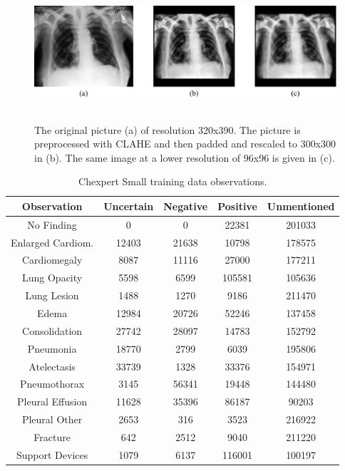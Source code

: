 \documentclass[12pt,DIV14,BCOR12mm,a4paper,footinclude=false,headinclude,parskip=half-,twoside,openright,cleardoublepage=empty,toc=index,bibliography=totoc,listof=totoc]{scrreprt}
\numberwithin{equation}{chapter}
\begin{document}
\begin{figure}[H]
\centering
\includegraphics[height=5cm]{thesis/figures/chexpert_prepro.pdf}
\caption{The original picture (a) of resolution 320x390. The picture is preprocessed with CLAHE and then padded and rescaled to 300x300 in (b). The same image at a lower resolution of 96x96 is given in (c).}
\label{fig:chexpert}
\end{figure}

\begin{table}[H]
\centering
\begin{tabular}{|c|c|c|c|c|}
\hline
 \textbf{Observation}& \textbf{Uncertain} & \textbf{Negative} & \textbf{Positive} & \textbf{Unmentioned} \\
\hline
No Finding & 0 & 0 & 22381 & 201033 \\
Enlarged Cardiom. & 12403 & 21638 & 10798 & 178575 \\
Cardiomegaly & 8087 & 11116 & 27000 & 177211 \\
Lung Opacity & 5598 & 6599 & 105581 & 105636 \\
Lung Lesion & 1488 & 1270 & 9186 & 211470 \\
Edema & 12984 & 20726 & 52246 & 137458 \\
Consolidation & 27742 & 28097 & 14783 & 152792 \\
Pneumonia & 18770 & 2799 & 6039 & 195806 \\
Atelectasis & 33739 & 1328 & 33376 & 154971 \\
Pneumothorax & 3145 & 56341 & 19448 & 144480 \\
Pleural Effusion & 11628 & 35396 & 86187 & 90203 \\
Pleural Other & 2653 & 316 & 3523 & 216922 \\
Fracture & 642 & 2512 & 9040 & 211220 \\
Support Devices & 1079 & 6137 & 116001 & 100197 \\
\hline
\end{tabular}
\caption{Chexpert Small training data observations.}
\label{tab:train_counts}
\end{table}
\end{document}
